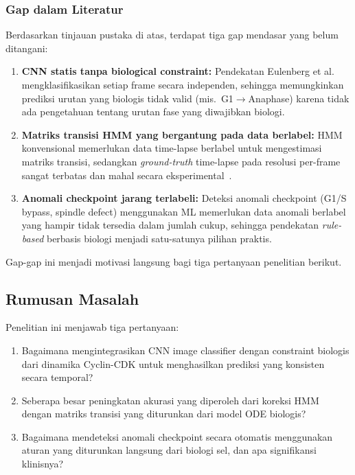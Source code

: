 \documentclass[conference]{IEEEtran}
\begin{document}
\subsubsection{Gap dalam Literatur}
Berdasarkan tinjauan pustaka di atas, terdapat tiga gap mendasar yang belum ditangani:
\begin{enumerate}[noitemsep,topsep=3pt]
    \item \textbf{CNN statis tanpa biological constraint:} Pendekatan Eulenberg et al.~\cite{eulenberg2017} mengklasifikasikan setiap frame secara independen, sehingga memungkinkan prediksi urutan yang biologis tidak valid (mis.\ G1$\rightarrow$Anaphase) karena tidak ada pengetahuan tentang urutan fase yang diwajibkan biologi.
    \item \textbf{Matriks transisi HMM yang bergantung pada data berlabel:} HMM konvensional memerlukan data time-lapse berlabel untuk mengestimasi matriks transisi, sedangkan \textit{ground-truth} time-lapse pada resolusi per-frame sangat terbatas dan mahal secara eksperimental~\cite{ljosa2012}.
    \item \textbf{Anomali checkpoint jarang terlabeli:} Deteksi anomali checkpoint (G1/S bypass, spindle defect) menggunakan ML memerlukan data anomali berlabel yang hampir tidak tersedia dalam jumlah cukup, sehingga pendekatan \textit{rule-based} berbasis biologi menjadi satu-satunya pilihan praktis.
\end{enumerate}
Gap-gap ini menjadi motivasi langsung bagi tiga pertanyaan penelitian berikut.

\subsection{Rumusan Masalah}

Penelitian ini menjawab tiga pertanyaan:
\begin{enumerate}[noitemsep,topsep=3pt]
    \item Bagaimana mengintegrasikan CNN image classifier dengan constraint biologis dari dinamika Cyclin-CDK untuk menghasilkan prediksi yang konsisten secara temporal?
    \item Seberapa besar peningkatan akurasi yang diperoleh dari koreksi HMM dengan matriks transisi yang diturunkan dari model ODE biologis?
    \item Bagaimana mendeteksi anomali checkpoint secara otomatis menggunakan aturan yang diturunkan langsung dari biologi sel, dan apa signifikansi klinisnya?
\end{enumerate}
\end{document}
